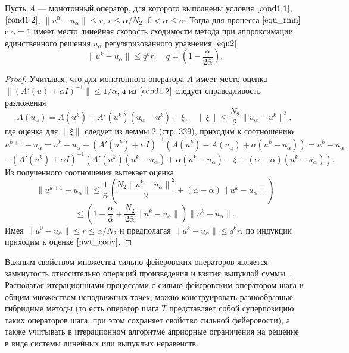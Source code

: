 \begin{theorem}\label{teo2.1} Пусть $A$ --- монотонный оператор, для которого выполнены условия $\eqref{cond1.1}$, $\eqref{cond1.2}$, $\|u^0-u_\alpha\| \le r$, $r\le \alpha/N_2$, $0<\alpha \le \bar\alpha$. Тогда для процесса $\eqref{equ_rmn}$ c $\gamma=1$ имеет место линейная скорость сходимости метода при аппроксимации единственного решения $u_\alpha$ регуляризованного уравнения $\eqref{equ2}$
	\begin{equation}\label{nwt_conv}
	\| u^k-u_\alpha \| \le q^kr, \quad q=(1-\frac{\alpha}{2\bar\alpha}).
	\end{equation}
\end{theorem}
\begin{proof} 
Учитывая, что для монотонного оператора $A$ имеет место оценка $\| (A'(u)+\bar\alpha I)^{-1} \| \le 1/\bar\alpha$, а из $\eqref{cond1.2}$ следует справедливость разложения
$$
A(u_\alpha)=A(u^k)+A'(u^k)(u_\alpha-u^k)+\xi, \quad \|\xi\|\le \frac{N_2}{2}\|u_\alpha-u^k\|^2,
$$
где оценка для $\|\xi\|$ следует из леммы 2 \cite{Tre1993} (стр. 339), приходим к соотношению 
$$
u^{k+1}-u_\alpha=u^k-u_\alpha-(A'(u^k)+\bar\alpha I)^{-1}(A(u^k)-A(u_\alpha)+\alpha(u^k-u_\alpha))=u^k- u_\alpha$$ $$-(A'(u^k)+\bar\alpha I)^{-1}(A'(u^k)(u^k-u_\alpha)+\bar\alpha(u^k-u_\alpha)-\xi+(\alpha-\bar\alpha)(u^k-u_\alpha)). $$
Из полученного соотношения вытекает оценка
$$
\|u^{k+1}-u_\alpha\|\le\frac{1}{\bar\alpha}\left(\frac{N_2{\|u^{k}-u_\alpha\|}^2}{2}+(\bar\alpha-\alpha)\|u^k-u_\alpha\|\right)$$
$$\le\left(1-\frac{\alpha}{\bar\alpha}+\frac{N_2}{2\bar\alpha}\|u^k-u_\alpha\|\right)\|u^k-u_\alpha\|.$$
Имея $\|u^0-u_\alpha\|\le r \le \alpha/N_2$ и предполагая $\| u^{k}-u_\alpha \|\le q^kr$, по индукции приходим к оценке $\eqref{nwt_conv}$.
\end{proof}

Важным свойством множества сильно фейеровских операторов является замкнутость относительно операций произведения и взятия выпуклой суммы~\cite{Vasin1988}. Располагая итерационными процессами с сильно фейеровским оператором шага и общим множеством неподвижных точек, можно конструировать разнообразные гибридные методы (то есть оператор шага $T$ представляет собой суперпозицию таких операторов шага, при этом сохраняет свойство сильной фейеровости), а также учитывать в итерационном алгоритме априорные ограничения на решение в виде системы линейных или выпуклых неравенств.

